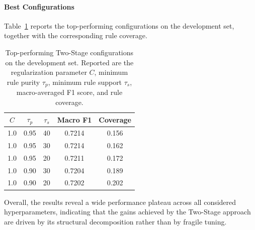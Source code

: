 \paragraph{Best Configurations}
Table~\ref{tab:best_twostage} reports the top-performing configurations on the
development set, together with the corresponding rule coverage.

\begin{table}[H]
\centering
\caption{Top-performing Two-Stage configurations on the development set.
Reported are the regularization parameter $C$, minimum rule purity $\tau_p$,
minimum rule support $\tau_s$, macro-averaged F1 score, and rule coverage.}
\label{tab:best_twostage}
\small
\begin{tabular}{ccccc}
\hline
\textbf{$C$} & \textbf{$\tau_p$} & \textbf{$\tau_s$} & \textbf{Macro F1} & \textbf{Coverage} \\
\hline
1.0  & 0.95 & 40 & 0.7214 & 0.156 \\
1.0  & 0.95 & 30 & 0.7214 & 0.162 \\
1.0  & 0.95 & 20 & 0.7211 & 0.172 \\
1.0  & 0.90 & 30 & 0.7204 & 0.189 \\
1.0  & 0.90 & 20 & 0.7202 & 0.202 \\
\hline
\end{tabular}
\end{table}

Overall, the results reveal a wide performance plateau across all considered
hyperparameters, indicating that the gains achieved by the Two-Stage approach
are driven by its structural decomposition rather than by fragile tuning.
